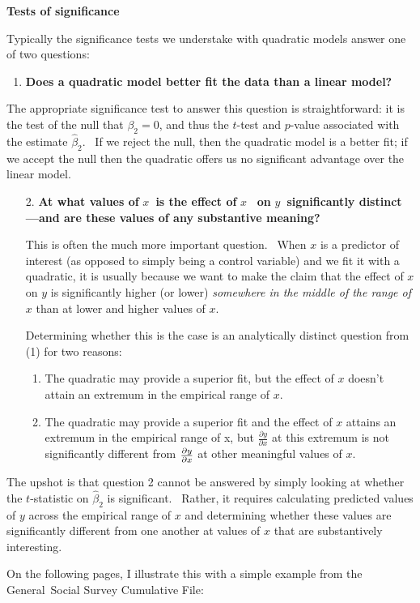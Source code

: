 \documentclass[11pt]{article}
\begin{document}
\medskip \textbf{Tests of significance}

Typically the significance tests we understake with quadratic models answer
one of two questions:

\begin{enumerate}
\item \textbf{Does a quadratic model better fit the data than a linear model?%
}
\end{enumerate}

The appropriate significance test to answer this question is
straightforward: it is the test of the null that $\beta _{2}=0$, and thus
the $t$-test and $p$-value associated with the estimate $\widehat{\beta }%
_{2}.$ \ If we reject the null, then the quadratic model is a better fit; if
we accept the null then the quadratic offers us no significant advantage
over the linear model.

\begin{enumerate}
\item[2.] \textbf{At what values of }$x$\textbf{\ is the effect of }$x$%
\textbf{\ on }$y$\textbf{\ significantly distinct---and are these values of
any substantive meaning?}

This is often the much more important question. \ When $x$ is a predictor of
interest (as opposed to simply being a control variable) and we fit it with
a quadratic, it is usually because we want to make the claim that the effect
of $x$ on $y$ is significantly higher (or lower) \textit{somewhere in the
middle of the range of }$\mathit{x}$ than at lower and higher values of $x$.
\  \medskip 

Determining whether this is the case is an analytically distinct question
from (1) for two reasons:

\begin{enumerate}
\item The quadratic may provide a superior fit, but the effect of $x$
doesn't attain an extremum in the empirical range of $x$.

\item The quadratic may provide a superior fit and the effect of $x$ attains
an extremum in the empirical range of x, but $\frac{\partial y}{\partial x}$
at this extremum is not significantly different from $\frac{\partial y}{%
\partial x}$ at other meaningful values of $x$.\medskip 
\end{enumerate}
\end{enumerate}

The upshot is that question 2 cannot be answered by simply looking at
whether the $t$-statistic on $\widehat{\beta }_{2}$ is significant. \
Rather, it requires calculating predicted values of $y$ across the empirical
range of $x$ and determining whether these values are significantly
different from one another at values of $x$ that are substantively
interesting. \ \medskip 

On the following pages, I illustrate this with a simple example from the
General\ Social Survey Cumulative File:\medskip 
\end{document}
